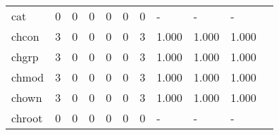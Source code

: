 \begin{longtable}{lp{1.20cm}p{1.20cm}p{1.20cm}p{1.20cm}p{1.20cm}p{1.20cm}p{1.20cm}p{1.20cm}p{1.20cm}p{1.20cm}}
cat       &                                     0 &                                                  0 &                                                  0 &                                                  0 &                                                  0 &                                                  0 &                                             - &                                                  - &                                                  - \\
chcon     &                                     3 &                                                  0 &                                                  0 &                                                  0 &                                                  0 &                                                  3 &                                         1.000 &                                              1.000 &                                              1.000 \\
chgrp     &                                     3 &                                                  0 &                                                  0 &                                                  0 &                                                  0 &                                                  3 &                                         1.000 &                                              1.000 &                                              1.000 \\
chmod     &                                     3 &                                                  0 &                                                  0 &                                                  0 &                                                  0 &                                                  3 &                                         1.000 &                                              1.000 &                                              1.000 \\
chown     &                                     3 &                                                  0 &                                                  0 &                                                  0 &                                                  0 &                                                  3 &                                         1.000 &                                              1.000 &                                              1.000 \\
chroot    &                                     0 &                                                  0 &                                                  0 &                                                  0 &                                                  0 &                                                  0 &                                             - &                                                  - &                                                  - \\

\end{longtable}

